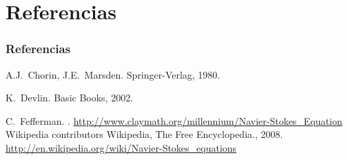 \documentclass[serif,9pt]{beamer}
\begin{document}
\section{Referencias} 

\begin{frame}\frametitle<presentation>{Referencias}


\begin{thebibliography}{10}

A.J.~Chorin, J.E.~Marsden.
\newblock Springer-Verlag, 1980.

K.~Devlin.
\newblock Basic Books, 2002.

C.~Fefferman.
.
\newblock 
\href{http://www.claymath.org/millennium/Navier-Stokes\_Equations/}{http://www.claymath.org/millennium/Navier-Stokes\_Equation}
Wikipedia contributors
\newblock Wikipedia, The Free Encyclopedia., 2008.
\newblock 
\href{http://en.wikipedia.org/wiki/Navier-Stokes\_equations}{http://en.wikipedia.org/wiki/Navier-Stokes\_equations}

\end{thebibliography}
\end{frame}
\end{document}
